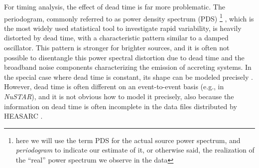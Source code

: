 \documentclass[twocolumn]{aastex61}
\newcommand{\project}[1]{\textsl{#1}}
\newcommand{\nustar}{\project{NuSTAR}\xspace}
\begin{document}
For timing analysis, the effect of dead time is far more problematic.
The periodogram, commonly referred to as power density spectrum (PDS)%
\footnote{here we will use the term PDS for the actual source power spectrum, and \textit{periodogram} to indicate our estimate of it, or otherwise said, the realization of the ``real'' power spectrum we observe in the data}%
, which is the most widely used statistical tool to investigate rapid variability, is heavily distorted by dead time, with a characteristic pattern similar to a damped oscillator.
This pattern is stronger for brighter sources, and it is often not possible to disentangle this power spectral distortion due to dead time and the broadband noise components characterizing the emission of accreting systems.
In the special case where dead time is constant, its shape can be modeled precisely \citep{Zhang+95,Vikhlinin+94}.
However, dead time is often different on an event-to-event basis (e.g., in \nustar), and it is not obvious how to model it precisely, also because the information on dead time is often incomplete in the data files distributed by HEASARC \citep[see, e.g.][]{Bachetti+15}.

\end{document}
